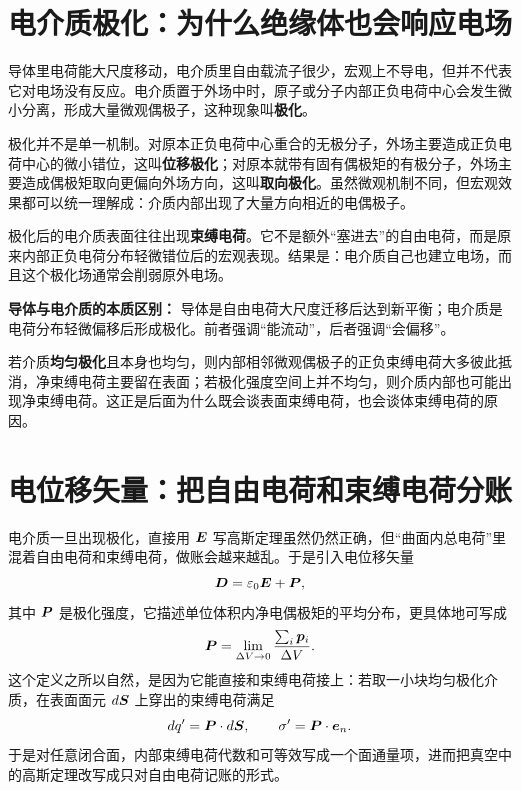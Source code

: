 \documentclass[lang=cn,11pt]{elegantbook}
\begin{document}
\section{电介质极化：为什么绝缘体也会响应电场}

导体里电荷能大尺度移动，电介质里自由载流子很少，宏观上不导电，但并不代表它对电场没有反应。电介质置于外场中时，原子或分子内部正负电荷中心会发生微小分离，形成大量微观偶极子，这种现象叫\textbf{极化}。

极化并不是单一机制。对原本正负电荷中心重合的无极分子，外场主要造成正负电荷中心的微小错位，这叫\textbf{位移极化}；对原本就带有固有偶极矩的有极分子，外场主要造成偶极矩取向更偏向外场方向，这叫\textbf{取向极化}。虽然微观机制不同，但宏观效果都可以统一理解成：介质内部出现了大量方向相近的电偶极子。

极化后的电介质表面往往出现\textbf{束缚电荷}。它不是额外“塞进去”的自由电荷，而是原来内部正负电荷分布轻微错位后的宏观表现。结果是：电介质自己也建立电场，而且这个极化场通常会削弱原外电场。

\begin{note}
\textbf{导体与电介质的本质区别：} 导体是自由电荷大尺度迁移后达到新平衡；电介质是电荷分布轻微偏移后形成极化。前者强调“能流动”，后者强调“会偏移”。
\end{note}

\begin{remark}
若介质\textbf{均匀极化}且本身也均匀，则内部相邻微观偶极子的正负束缚电荷大多彼此抵消，净束缚电荷主要留在表面；若极化强度空间上并不均匀，则介质内部也可能出现净束缚电荷。这正是后面为什么既会谈表面束缚电荷，也会谈体束缚电荷的原因。
\end{remark}

\section{电位移矢量：把自由电荷和束缚电荷分账}

电介质一旦出现极化，直接用 \(\vb*{E}\) 写高斯定理虽然仍然正确，但“曲面内总电荷”里混着自由电荷和束缚电荷，做账会越来越乱。于是引入电位移矢量
\[
\vb*{D}=\varepsilon_0\vb*{E}+\vb*{P},
\]
其中 \(\vb*{P}\) 是极化强度，它描述单位体积内净电偶极矩的平均分布，更具体地可写成
\[
\vb*{P}=\lim_{\Delta V\to 0}\frac{\sum_i \vb*{p}_i}{\Delta V}.
\]
这个定义之所以自然，是因为它能直接和束缚电荷接上：若取一小块均匀极化介质，在表面面元 \(d\vb*{S}\) 上穿出的束缚电荷满足
\[
dq'=\vb*{P}\cdot d\vb*{S},
\qquad
\sigma'=\vb*{P}\cdot \vb*{e}_n.
\]
于是对任意闭合面，内部束缚电荷代数和可等效写成一个面通量项，进而把真空中的高斯定理改写成只对自由电荷记账的形式。
\end{document}
